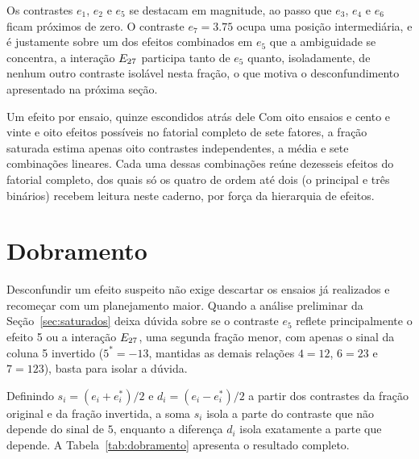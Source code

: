 \documentclass{doeapostila}
\begin{document}
Os contrastes $e_{1}$, $e_{2}$ e $e_{5}$ se destacam em magnitude, ao passo
que $e_{3}$, $e_{4}$ e $e_{6}$ ficam próximos de zero. O contraste $e_{7} =
\num{3.75}$ ocupa uma posição intermediária, e é justamente sobre um dos
efeitos combinados em $e_{5}$ que a ambiguidade se concentra, a interação
$E_{27}$ participa tanto de $e_{5}$ quanto, isoladamente, de nenhum
outro contraste isolável nesta fração, o que motiva o desconfundimento
apresentado na próxima seção.

\begin{aplicacao}{Um efeito por ensaio, quinze escondidos atrás dele}
  Com oito ensaios e cento e vinte e oito efeitos possíveis no fatorial
  completo de sete fatores, a fração saturada estima apenas oito contrastes
  independentes, a média e sete combinações lineares. Cada uma dessas
  combinações reúne dezesseis efeitos do fatorial completo, dos quais só os
  quatro de ordem até dois (o principal e três binários) recebem leitura
  neste caderno, por força da hierarquia de efeitos.
\end{aplicacao}

\section{Dobramento}
\label{sec:dobramento}

Desconfundir um efeito suspeito não exige descartar os ensaios já realizados
e recomeçar com um planejamento maior. Quando a análise preliminar da
Seção~\ref{sec:saturados} deixa dúvida sobre se o contraste $e_{5}$ reflete
principalmente o efeito 5 ou a interação $E_{27}$, uma segunda fração
menor, com apenas o sinal da coluna 5 invertido ($5^{*} = -13$, mantidas as
demais relações $4 = 12$, $6 = 23$ e $7 = 123$), basta para isolar a dúvida.

Definindo $s_{i} = (e_{i} + e_{i}^{*})/2$ e $d_{i} = (e_{i} - e_{i}^{*})/2$
a partir dos contrastes da fração original e da fração invertida, a soma
$s_{i}$ isola a parte do contraste que não depende do sinal de $5$, enquanto
a diferença $d_{i}$ isola exatamente a parte que depende. A
Tabela~\ref{tab:dobramento} apresenta o resultado completo.
\end{document}
